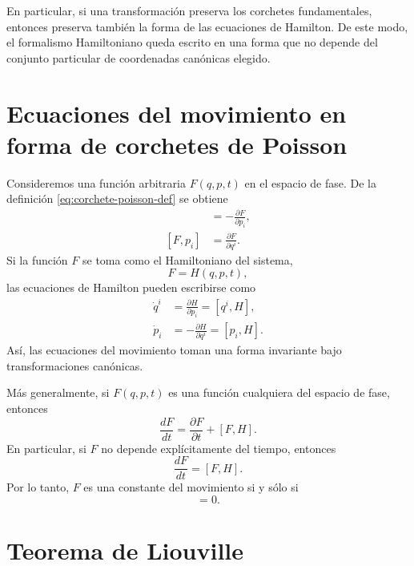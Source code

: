 \documentclass[../apunte_mecanica_clasica.tex]{subfiles}
\begin{document}
En particular, si una transformación preserva los corchetes fundamentales, entonces preserva también la forma de las ecuaciones de Hamilton. De este modo, el formalismo Hamiltoniano queda escrito en una forma que no depende del conjunto particular de coordenadas canónicas elegido.

\section{Ecuaciones del movimiento en forma de corchetes de Poisson}

Consideremos una función arbitraria $F(q,p,t)$ en el espacio de fase. De la definición \eqref{eq:corchete-poisson-def} se obtiene
\begin{align}
    [F,q^i]
    &=
    -\frac{\partial F}{\partial p_i},
    \label{eq:F-qi} \\
    [F,p_i]
    &=
    \frac{\partial F}{\partial q^i}.
    \label{eq:F-pi}
\end{align}
Si la función $F$ se toma como el Hamiltoniano del sistema,
\begin{equation}
    F=H(q,p,t),
    \label{eq:F-igual-H}
\end{equation}
las ecuaciones de Hamilton pueden escribirse como
\begin{align}
    \dot q^i &= \frac{\partial H}{\partial p_i}=[q^i,H],
    \label{eq:hamilton-poisson-q} \\
    \dot p_i &= -\frac{\partial H}{\partial q^i}=[p_i,H].
    \label{eq:hamilton-poisson-p}
\end{align}
Así, las ecuaciones del movimiento toman una forma invariante bajo transformaciones canónicas.

Más generalmente, si $F(q,p,t)$ es una función cualquiera del espacio de fase, entonces
\begin{equation}
    \frac{dF}{dt}
    =
    \frac{\partial F}{\partial t}+[F,H].
    \label{eq:evolucion-f-poisson}
\end{equation}
En particular, si $F$ no depende explícitamente del tiempo, entonces
\begin{equation}
    \frac{dF}{dt}=[F,H].
    \label{eq:evolucion-f-sin-tiempo}
\end{equation}
Por lo tanto, $F$ es una constante del movimiento si y sólo si
\begin{equation}
    [F,H]=0.
    \label{eq:condicion-constante-movimiento}
\end{equation}

\section{Teorema de Liouville}
\end{document}

